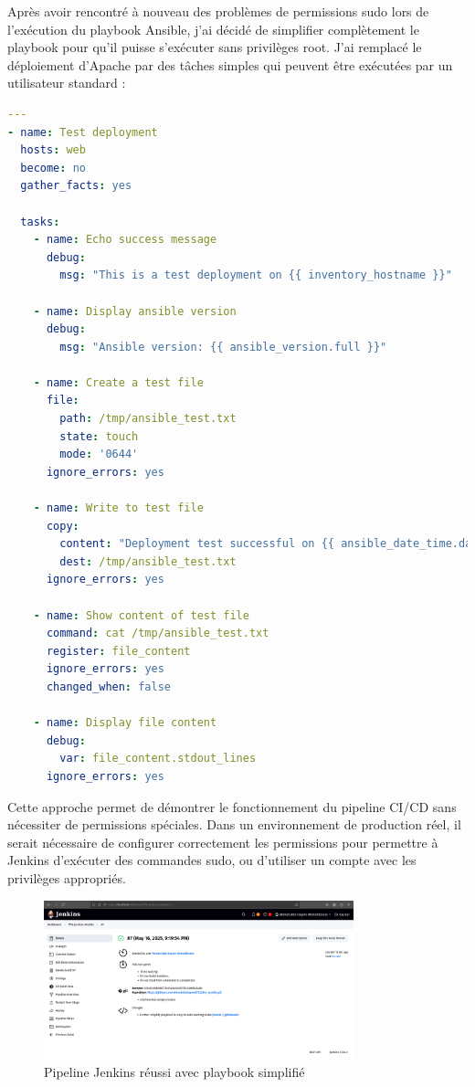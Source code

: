 \documentclass{article}
\begin{document}
Après avoir rencontré à nouveau des problèmes de permissions sudo lors de l'exécution du playbook Ansible, j'ai décidé de simplifier complètement le playbook pour qu'il puisse s'exécuter sans privilèges root. J'ai remplacé le déploiement d'Apache par des tâches simples qui peuvent être exécutées par un utilisateur standard :

\begin{lstlisting}[language=yaml]
---
- name: Test deployment 
  hosts: web
  become: no
  gather_facts: yes
  
  tasks:
    - name: Echo success message
      debug:
        msg: "This is a test deployment on {{ inventory_hostname }}"

    - name: Display ansible version
      debug:
        msg: "Ansible version: {{ ansible_version.full }}"

    - name: Create a test file
      file:
        path: /tmp/ansible_test.txt
        state: touch
        mode: '0644'
      ignore_errors: yes

    - name: Write to test file
      copy:
        content: "Deployment test successful on {{ ansible_date_time.date }} at {{ ansible_date_time.time }}"
        dest: /tmp/ansible_test.txt
      ignore_errors: yes

    - name: Show content of test file
      command: cat /tmp/ansible_test.txt
      register: file_content
      ignore_errors: yes
      changed_when: false

    - name: Display file content
      debug:
        var: file_content.stdout_lines
      ignore_errors: yes
\end{lstlisting}

Cette approche permet de démontrer le fonctionnement du pipeline CI/CD sans nécessiter de permissions spéciales. Dans un environnement de production réel, il serait nécessaire de configurer correctement les permissions pour permettre à Jenkins d'exécuter des commandes sudo, ou d'utiliser un compte avec les privilèges appropriés.

\begin{figure}[h]
    \centering
    \includegraphics[width=0.8\textwidth]{images/jenkins_pipeline_simple.png}
    \caption{Pipeline Jenkins réussi avec playbook simplifié}
    \label{fig:jenkins_pipeline_simple}
\end{figure}
\end{document}
